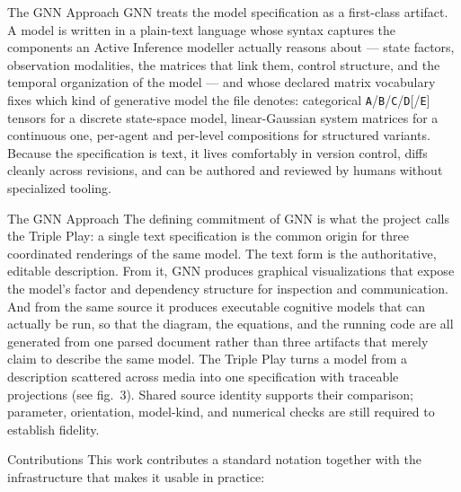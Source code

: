 \documentclass[
  ignorenonframetext,
]{beamer}
\begin{document}
\begin{frame}{The GNN Approach}
\protect{}\label{the-gnn-approach}
GNN treats the model specification as a first-class artifact. A model is
written in a plain-text language whose syntax captures the components an
Active Inference modeller actually reasons about --- state factors,
observation modalities, the matrices that link them, control structure,
and the temporal organization of the model --- and whose declared matrix
vocabulary fixes which kind of generative model the file denotes:
categorical \texttt{A}/\texttt{B}/\texttt{C}/\texttt{D}{[}/\texttt{E}{]}
tensors for a discrete state-space model, linear-Gaussian system
matrices for a continuous one, per-agent and per-level compositions for
structured variants. Because the specification is text, it lives
comfortably in version control, diffs cleanly across revisions, and can
be authored and reviewed by humans without specialized tooling.

\end{frame}

\begin{frame}{The GNN Approach}
The defining commitment of GNN is what the project calls the Triple
Play: a single text specification is the common origin for three
coordinated renderings of the same model. The text form is the
authoritative, editable description. From it, GNN produces graphical
visualizations that expose the model's factor and dependency structure
for inspection and communication. And from the same source it produces
executable cognitive models that can actually be run, so that the
diagram, the equations, and the running code are all generated from one
parsed document rather than three artifacts that merely claim to
describe the same model. The Triple Play turns a model from a
description scattered across media into one specification with traceable
projections (see fig.~3). Shared source identity
supports their comparison; parameter, orientation, model-kind, and
numerical checks are still required to establish fidelity.
\end{frame}

\begin{frame}[allowframebreaks]{Contributions}
\protect{}\label{contributions}
This work contributes a standard notation together with the
infrastructure that makes it usable in practice:

\end{frame}
\end{document}
